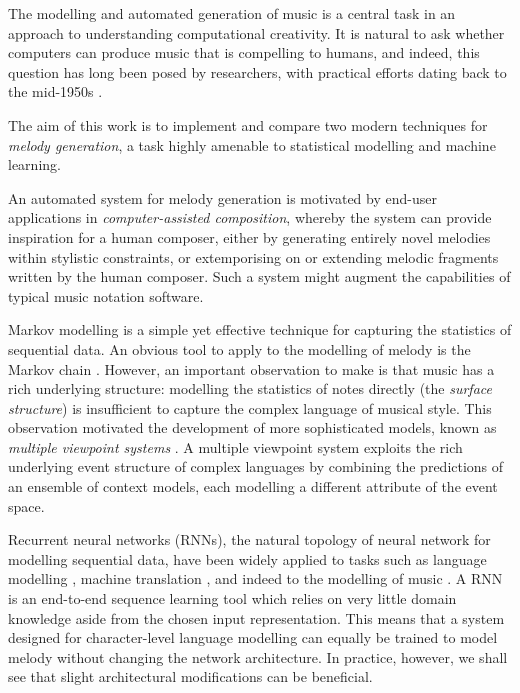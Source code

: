 \documentclass[12pt,a4paper,twoside,openright]{report}
\begin{document}
The modelling and automated generation of music is a central task in an approach
to understanding computational creativity. It is natural to ask whether
computers can produce music that is compelling to humans, and indeed, this
question has long been posed by researchers, with practical efforts dating back
to the mid-1950s \cite{ames1987automated}. 

The aim of this work is to implement and compare two modern techniques for
\emph{melody generation}, a task highly amenable to statistical modelling and
machine learning. 

An automated system for melody generation is motivated by end-user applications
in \emph{computer-assisted composition}, whereby the system can provide
inspiration for a human composer, either by generating entirely novel melodies
within stylistic constraints, or extemporising on or extending melodic
fragments written by the human composer. Such a system might augment the
capabilities of typical music notation software. 

Markov modelling is a simple yet effective technique for capturing the
statistics of sequential data. An obvious tool to apply to the modelling of
melody is the Markov chain \cite{ames1989markov}. However, an important
observation to make is that music has a rich underlying structure: modelling the
statistics of notes directly (the \emph{surface structure}) is insufficient to
capture the complex language of musical style. This observation motivated the
development of more sophisticated models, known as \emph{multiple viewpoint
systems} \cite{conklin1995viewpoints}.  A multiple viewpoint system exploits the
rich underlying event structure of complex languages by combining the
predictions of an ensemble of context models, each modelling a different
attribute of the event space.

Recurrent neural networks (RNNs), the natural topology of neural network for
modelling sequential data, have been widely applied to tasks such as language
modelling \cite{graves2013generating}, machine translation
\cite{sutskever2014sequence}, and indeed to the modelling of music
\cite{boulanger2012modeling}. A RNN is an end-to-end sequence learning tool which
relies on very little domain knowledge aside from the chosen input
representation. This means that a system designed for character-level language
modelling can equally be trained to model melody without changing the network
architecture. In practice, however, we shall see that slight architectural
modifications can be beneficial.
\end{document}
